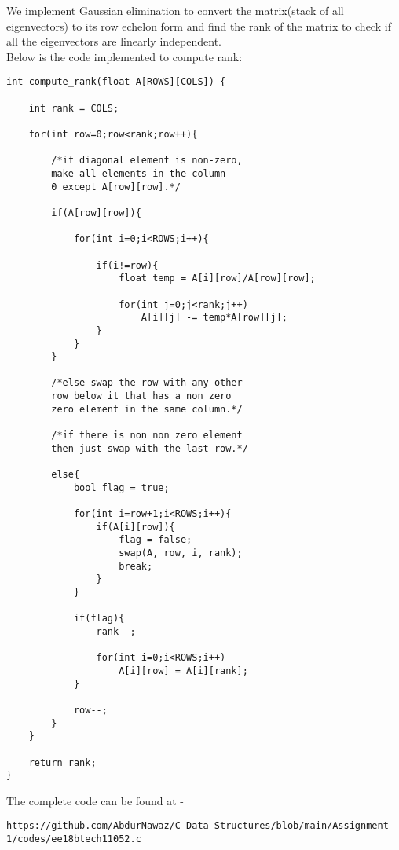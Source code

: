 \documentclass[journal,12pt,twocolumn]{IEEEtran}
\begin{document}
We implement Gaussian elimination to convert the matrix(stack of all eigenvectors) to its row echelon form and find the rank of the matrix to check if all the eigenvectors are linearly independent.
\\

Below is the code implemented to compute rank:
\begin{lstlisting}
int compute_rank(float A[ROWS][COLS]) {

    int rank = COLS;

    for(int row=0;row<rank;row++){

        /*if diagonal element is non-zero,
        make all elements in the column
        0 except A[row][row].*/

        if(A[row][row]){

            for(int i=0;i<ROWS;i++){

                if(i!=row){
                    float temp = A[i][row]/A[row][row];

                    for(int j=0;j<rank;j++)
                        A[i][j] -= temp*A[row][j];
                }
            }
        }

        /*else swap the row with any other
        row below it that has a non zero
        zero element in the same column.*/

        /*if there is non non zero element
        then just swap with the last row.*/

        else{
            bool flag = true;

            for(int i=row+1;i<ROWS;i++){
                if(A[i][row]){
                    flag = false;
                    swap(A, row, i, rank);
                    break;
                }
            }

            if(flag){
                rank--;

                for(int i=0;i<ROWS;i++)
                    A[i][row] = A[i][rank];
            }

            row--;
        }
    }

    return rank;
}
\end{lstlisting}

The complete code can be found at - 
\begin{lstlisting}
https://github.com/AbdurNawaz/C-Data-Structures/blob/main/Assignment-1/codes/ee18btech11052.c
\end{lstlisting}


\end{document}
